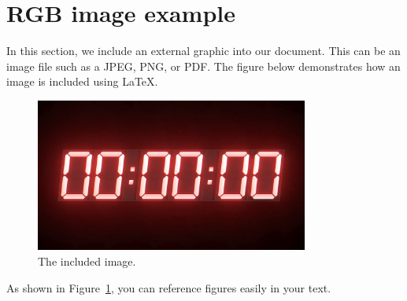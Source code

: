 \section{RGB image example}

In this section, we include an external graphic into our document. This can be an image file such as a JPEG, PNG, or PDF. The figure below demonstrates how an image is included using LaTeX.

\begin{figure}[htbp]
\centering
\includegraphics[width=0.8\textwidth]{Image files/66.png} %

\caption{The included image.} %
\label{fig:external-graphic} %
\end{figure}

As shown in Figure~\ref{fig:external-graphic}, you can reference figures easily in your text.
